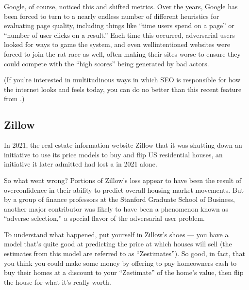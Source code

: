 \documentclass[letterpaper,10pt,english]{jupyterBook}
\begin{document}
\sphinxAtStartPar
Google, of course, noticed this and shifted metrics. Over the years, Google has been forced to turn to a nearly endless number of different heuristics for evaluating page quality, including things like “time users spend on a page” or “number of user clicks on a result.” Each time this occurred, adversarial users looked for ways to game the system, and even well\sphinxhyphen{}intentioned websites were forced to join the rat race as well, often making their sites worse to ensure they could compete with the “high scores” being generated by bad actors.

\sphinxAtStartPar
(If you’re interested in multitudinous ways in which SEO is responsible for how the internet looks and feels today, you can do no better than this recent feature from .)


\subsection{Zillow}
\label{\detokenize{30_questions/29_passive_external_adversarial_users_examples:zillow}}
\sphinxAtStartPar
In 2021, the real estate information website Zillow  that it was shutting down an initiative to use its price models to buy and flip US residential houses, an initiative it later admitted had lost a  in 2021 alone.

\sphinxAtStartPar
So what went wrong? Portions of Zillow’s loss appear to have been the result of over\sphinxhyphen{}confidence in their ability to predict overall housing market movements. But  by a group of finance professors at the Stanford Graduate School of Business, another major contributor was likely to have been a phenomenon known as “adverse selection,” a special flavor of the adversarial user problem.

\sphinxAtStartPar
To understand what happened, put yourself in Zillow’s shoes — you have a model that’s quite good at predicting the price at which houses will sell (the estimates from this model are referred to as “Zestimates”). So good, in fact, that you think you could make some money by offering to pay homeowners cash to buy their homes at a discount to your “Zestimate” of the home’s value, then flip the house for what it’s really worth.
\end{document}
